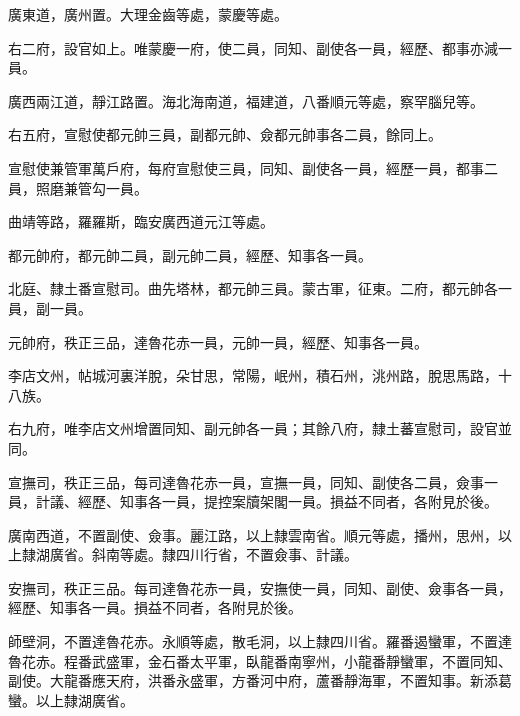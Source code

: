 \begin{pinyinscope}
 廣東道，廣州置。大理金齒等處，蒙慶等處。



 右二府，設官如上。唯蒙慶一府，使二員，同知、副使各一員，經歷、都事亦減一員。



 廣西兩江道，靜江路置。海北海南道，福建道，八番順元等處，察罕腦兒等。



 右五府，宣慰使都元帥三員，副都元帥、僉都元帥事各二員，餘同上。



 宣慰使兼管軍萬戶府，每府宣慰使三員，同知、副使各一員，經歷一員，都事二員，照磨兼管勾一員。



 曲靖等路，羅羅斯，臨安廣西道元江等處。



 都元帥府，都元帥二員，副元帥二員，經歷、知事各一員。



 北庭、隸土番宣慰司。曲先塔林，都元帥三員。蒙古軍，征東。二府，都元帥各一員，副一員。



 元帥府，秩正三品，達魯花赤一員，元帥一員，經歷、知事各一員。



 李店文州，帖城河裏洋脫，朵甘思，常陽，岷州，積石州，洮州路，脫思馬路，十八族。



 右九府，唯李店文州增置同知、副元帥各一員；其餘八府，隸土蕃宣慰司，設官並同。



 宣撫司，秩正三品，每司達魯花赤一員，宣撫一員，同知、副使各二員，僉事一員，計議、經歷、知事各一員，提控案牘架閣一員。損益不同者，各附見於後。



 廣南西道，不置副使、僉事。麗江路，以上隸雲南省。順元等處，播州，思州，以上隸湖廣省。斜南等處。隸四川行省，不置僉事、計議。



 安撫司，秩正三品。每司達魯花赤一員，安撫使一員，同知、副使、僉事各一員，經歷、知事各一員。損益不同者，各附見於後。



 師壁洞，不置達魯花赤。永順等處，散毛洞，以上隸四川省。羅番遏蠻軍，不置達魯花赤。程番武盛軍，金石番太平軍，臥龍番南寧州，小龍番靜蠻軍，不置同知、副使。大龍番應天府，洪番永盛軍，方番河中府，蘆番靜海軍，不置知事。新添葛蠻。以上隸湖廣省。




\end{pinyinscope}
